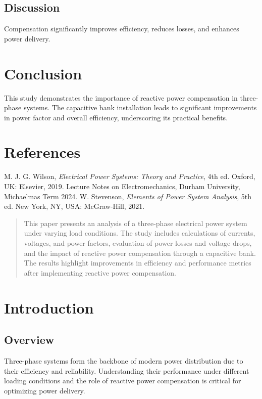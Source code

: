 \documentclass[conference]{IEEEtran}
\begin{document}
\subsection{Discussion}
Compensation significantly improves efficiency, reduces losses, and enhances power delivery.

\section{Conclusion}
This study demonstrates the importance of reactive power compensation in three-phase systems. The capacitive bank installation leads to significant improvements in power factor and overall efficiency, underscoring its practical benefits.

\section*{References}
\begin{thebibliography}{1}
 M. J. G. Wilson, \emph{Electrical Power Systems: Theory and Practice}, 4th ed. Oxford, UK: Elsevier, 2019.
 Lecture Notes on Electromechanics, Durham University, Michaelmas Term 2024.
 W. Stevenson, \emph{Elements of Power System Analysis}, 5th ed. New York, NY, USA: McGraw-Hill, 2021.
\end{thebibliography}

 
\newpage
\begin{abstract}
This paper presents an analysis of a three-phase electrical power system under varying load conditions. The study includes calculations of currents, voltages, and power factors, evaluation of power losses and voltage drops, and the impact of reactive power compensation through a capacitive bank. The results highlight improvements in efficiency and performance metrics after implementing reactive power compensation.
\end{abstract}

\section{Introduction}

\subsection{Overview}
Three-phase systems form the backbone of modern power distribution due to their efficiency and reliability. Understanding their performance under different loading conditions and the role of reactive power compensation is critical for optimizing power delivery.
\end{document}
